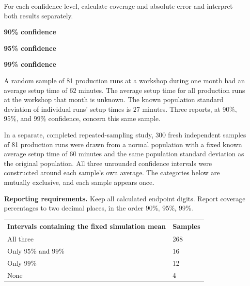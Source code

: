 
For each confidence level, calculate coverage and absolute error and interpret both results separately.
\par\textbf{90\% confidence}\workspace{.65in}
\par\textbf{95\% confidence}\workspace{.65in}
\par\textbf{99\% confidence}\workspace{.65in}
\workspace{.4in}
\vfill

\clearpage
{}
A random sample of 81 production runs at a workshop during one month had an average setup time of 62 minutes. The average setup time for all production runs at the workshop that month is unknown. The known population standard deviation of individual runs' setup times is 27 minutes. Three reports, at 90\%, 95\%, and 99\% confidence, concern this same sample.

In a separate, completed repeated-sampling study, 300 fresh independent samples of 81 production runs were drawn from a normal population with a fixed known average setup time of 60 minutes and the same population standard deviation as the original population. All three unrounded confidence intervals were constructed around each sample's own average. The categories below are mutually exclusive, and each sample appears once.

\textbf{Reporting requirements.} Keep all calculated endpoint digits. Report coverage percentages to two decimal places, in the order 90\%, 95\%, 99\%.

\begin{center}\begin{tabular}{@{}ll@{}}\toprule
Intervals containing the fixed simulation mean & Samples\\\midrule
All three & 268\\
Only 95\% and 99\% & 16\\
Only 99\% & 12\\
None & 4\\
\bottomrule\end{tabular}\end{center}


\BlankInformationTable
\clearpage
{}

